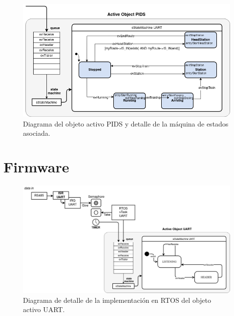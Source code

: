 \begin{figure}[ht]
	\centering
	\includegraphics[width=1\textwidth]{./Figures/fsmTrain.png}
	\caption{Diagrama del objeto activo PIDS y detalle de la máquina de estados asociada.}
	\label{fig:fsmTrain}
\end{figure}

\pagebreak
\section{Firmware}


\begin{figure}[ht]
	\centering
	\includegraphics[width=1\textwidth]{./Figures/fsmUART.png}
	\caption{Diagrama de detalle de la implementación en RTOS del objeto activo UART.}
	\label{fig:fsmUART}
\end{figure}


